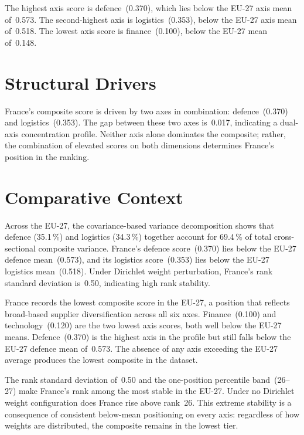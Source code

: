 \documentclass[12pt,a4paper]{article}
\begin{document}
The highest axis score is defence~(0.370), which lies below the EU-27 axis mean of~0.573.  The second-highest axis is logistics~(0.353), below the EU-27 axis mean of~0.518.  The lowest axis score is finance~(0.100), below the EU-27 mean of~0.148.


\section{Structural Drivers}
\label{sec:drivers}

\begin{sloppypar}
France's composite score is driven by two axes in combination: defence~(0.370) and logistics~(0.353).  The gap between these two axes is~0.017, indicating a dual-axis concentration profile.  Neither axis alone dominates the composite; rather, the combination of elevated scores on both dimensions determines France's position in the ranking.
\end{sloppypar}


\section{Comparative Context}
\label{sec:comparative}

Across the EU-27, the covariance-based variance decomposition shows that defence (35.1\,\%) and logistics (34.3\,\%) together account for 69.4\,\% of total cross-sectional composite variance.  France's defence score~(0.370) lies below the EU-27 defence mean~(0.573), and its logistics score~(0.353) lies below the EU-27 logistics mean~(0.518).  Under Dirichlet weight perturbation, France's rank standard deviation is~0.50, indicating high rank stability.



France records the lowest composite score in the EU-27, a position that reflects broad-based supplier diversification across all six axes.  Finance~(0.100) and technology~(0.120) are the two lowest axis scores, both well below the EU-27 means.  Defence~(0.370) is the highest axis in the profile but still falls below the EU-27 defence mean of~0.573.  The absence of any axis exceeding the EU-27 average produces the lowest composite in the dataset.

The rank standard deviation of~0.50 and the one-position percentile band~(26--27) make France's rank among the most stable in the EU-27.  Under no Dirichlet weight configuration does France rise above rank~26.  This extreme stability is a consequence of consistent below-mean positioning on every axis: regardless of how weights are distributed, the composite remains in the lowest tier.
\end{document}
